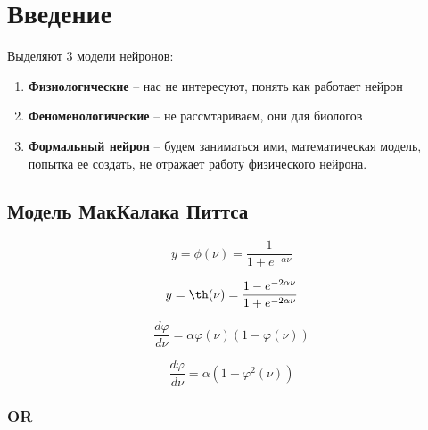 \section{Введение}

Выделяют 3 модели нейронов:

\begin{enumerate}
    \item \textbf{Физиологические} -- нас не интересуют, понять как работает нейрон
    \item \textbf{Феноменологические} -- не рассмтариваем, они для биологов
    \item \textbf{Формальный нейрон} -- будем заниматься ими, математическая модель, попытка ее создать, не отражает работу физического нейрона.
\end{enumerate}

\subsection{Модель МакКалака Питтса}

\begin{equation*}
    y = \phi(\nu) = \frac{1}{1 + e^{-\alpha \nu}}
\end{equation*}

\begin{equation*}
    y = \th(\nu) = \frac{1 - e^{-2\alpha\nu}}{1 + e^{-2\alpha\nu}}
\end{equation*}

\begin{equation*}
    \frac{d \varphi}{d \nu} = \alpha \varphi(\nu)(1 - \varphi(\nu))
\end{equation*}

\begin{equation*}
    \frac{d \varphi}{d \nu} = \alpha (1 - \varphi^2(\nu))
\end{equation*}

\subsubsection{OR}

\begin{center}
\end{center}

